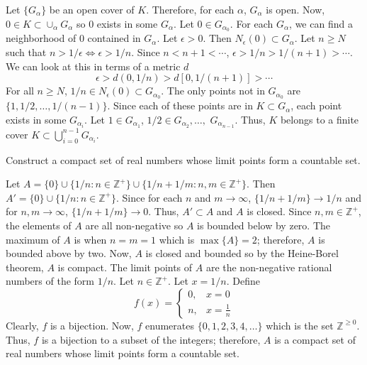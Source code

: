 \begin{exercise}
  \par\smallskip
  Let \(\{G_{\alpha}\}\) be an open cover of \(K\).
  Therefore, for each \(\alpha\), \(G_{\alpha}\) is open.
  Now, \(0\in K\subset\cup_{\alpha}G_{\alpha}\) so \(0\) exists in some
  \(G_{\alpha}\).
  Let \(0\in G_{\alpha_0}\).
  For each \(G_{\alpha}\), we can find a neighborhood of \(0\) contained in
  \(G_{\alpha}\).
  Let \(\epsilon > 0\).
  Then \(N_{\epsilon}(0)\subset G_{\alpha}\).
  Let \(n\geq N\) such that \(n > 1/\epsilon\iff\epsilon > 1/n\).
  Since \(n < n + 1 < \cdots\), \(\epsilon > 1/n > 1/(n + 1) > \cdots\).
  We can look at this in terms of a metric \(d\)
  \[
  \epsilon > d(0, 1/n) > d[0, 1/(n + 1)] > \cdots
  \]
  For all \(n\geq N\), \(1/n\in N_{\epsilon}(0)\subset G_{\alpha_0}\).
  The only points not in \(G_{\alpha_0}\) are \(\{1,1/2,\ldots,1/(n - 1)\}\).
  Since each of these points are in \(K\subset G_{\alpha}\), each point exists
  in some \(G_{\alpha_i}\).
  Let \(1\in G_{\alpha_1}\), \(1/2\in G_{\alpha_2},\ldots,\)
  \(G_{\alpha_{n - 1}}\).
  Thus, \(K\) belongs to a finite cover
  \(K\subset\bigcup_{i = 0}^{n - 1}G_{\alpha_i}\).
\item
  Construct a compact set of real numbers whose limit points form a countable
  set.
  \par\smallskip
  Let \(A = \{0\}\cup\{1/n\colon n\in\mathbb{Z}^+\}\cup
  \{1/n + 1/m\colon n,m\in\mathbb{Z}^+\}\).
  Then \(A' = \{0\}\cup\{1/n\colon n\in\mathbb{Z}^+\}\).
  Since for each \(n\) and \(m\to\infty\), \(\{1/n + 1/m\}\to 1/n\) and
  for \(n,m\to\infty\), \(\{1/n + 1/m\}\to 0\).
  Thus, \(A'\subset A\) and \(A\) is closed.
  Since \(n,m\in\mathbb{Z}^+\), the elements of \(A\) are all non-negative so
  \(A\) is bounded below by zero.
  The maximum of \(A\) is when \(n = m = 1\) which is \(\max\{A\} = 2\);
  therefore, \(A\) is bounded above by two.
  Now, \(A\) is closed and bounded so by the Heine-Borel theorem, \(A\) is
  compact.
  The limit points of \(A\) are the non-negative rational numbers of the form
  \(1/n\).
  Let \(n\in\mathbb{Z}^+\).
  Let \(x = 1/n\).
  Define
  \[
  f(x) =
  \begin{cases}
    0, & x = 0\\
    n, & x = \frac{1}{n}
  \end{cases}
  \]
  Clearly, \(f\) is a bijection.
  Now, \(f\) enumerates \(\{0,1,2,3,4,\ldots\}\) which is the set
  \(\mathbb{Z}^{\geq 0}\).
  Thus, \(f\) is a bijection to a subset of the integers; therefore, \(A\) is
  a compact set of real numbers whose limit points form a countable set.
\item

\end{exercise}

